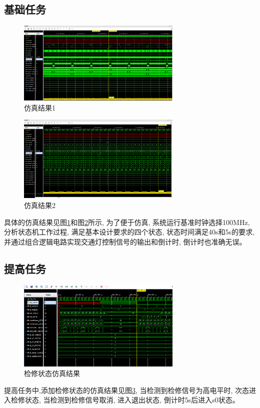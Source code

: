 \documentclass{article}
\begin{document}
\subsection*{基础任务}
\vspace{-0.6cm}
\begin{figure}[H]
    \centering
    \includegraphics[width=0.7\textwidth]{image/2024-06-18-22-23-15.png}
    \caption{仿真结果1}
    \label{image_base_sim_1}
\end{figure}
\begin{figure}[H]
    \centering
    \includegraphics[width=0.7\textwidth]{image/2024-06-18-22-23-37.png}
    \caption{仿真结果2}
    \label{image_base_sim_2}
\end{figure}
具体的仿真结果见图\ref{image_base_sim_1}和图\ref{image_base_sim_2}所示, 为了便于仿真, 系统运行基准时钟选择100MHz, 
分析状态机工作过程, 满足基本设计要求的四个状态, 状态时间满足40s和5s的要求, 并通过组合逻辑电路实现交通灯控制信号的输出和倒计时, 倒计时也准确无误。
\subsection*{提高任务}
\begin{figure}[htbp]
    \centering
    \includegraphics[width=0.7\textwidth]{image/2024-06-19-15-31-01.png}
    \caption{检修状态仿真结果}
    \label{image_repair_sim}
\end{figure}
提高任务中,添加检修状态的仿真结果见图\ref{image_repair_sim}, 当检测到检修信号为高电平时, 次态进入检修状态, 当检测到检修信号取消, 进入退出状态, 倒计时5s后进入s0状态。
\end{document}
